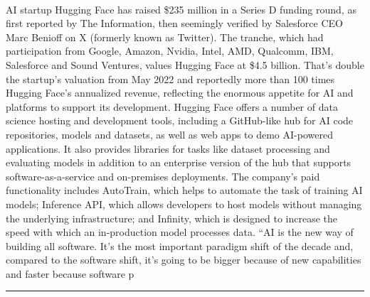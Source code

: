 \documentclass[10pt,a4paper]{article}
\begin{document}
\begin{multicols*}{2}
\paragraph{}
AI startup Hugging Face has raised \$235 million in a Series D funding round, as first reported by The Information, then seemingly verified by Salesforce CEO Marc Benioff on X (formerly known as Twitter). The tranche, which had participation from Google, Amazon, Nvidia, Intel, AMD, Qualcomm, IBM, Salesforce and Sound Ventures, values Hugging Face at \$4.5 billion. That’s double the startup’s valuation from May 2022 and reportedly more than 100 times Hugging Face’s annualized revenue, reflecting the enormous appetite for AI and platforms to support its development.
Hugging Face offers a number of data science hosting and development tools, including a GitHub-like hub for AI code repositories, models and datasets, as well as web apps to demo AI-powered applications. It also provides libraries for tasks like dataset processing and evaluating models in addition to an enterprise version of the hub that supports software-as-a-service and on-premises deployments.
The company’s paid functionality includes AutoTrain, which helps to automate the task of training AI models; Inference API, which allows developers to host models without managing the underlying infrastructure; and Infinity, which is designed to increase the speed with which an in-production model processes data.
“AI is the new way of building all software. It’s the most important paradigm shift of the decade and, compared to the software shift, it’s going to be bigger because of new capabilities and faster because software p
\par\noindent\textcolor{red}{\rule{\linewidth}{0.2mm}}
\vfill
\null
\noindent\begin{minipage}{\linewidth}

\end{minipage}
\end{multicols*}
\end{document}
